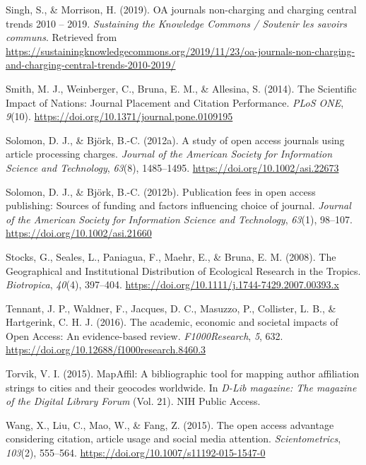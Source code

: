 \documentclass[
  english,
  man]{apa6}
\begin{document}
\leavevmode\hypertarget{ref-singh_oa_2019}{}%
Singh, S., \& Morrison, H. (2019). OA journals non-charging and charging central trends 2010 -- 2019. \emph{Sustaining the Knowledge Commons / Soutenir les savoirs communs}. Retrieved from \url{https://sustainingknowledgecommons.org/2019/11/23/oa-journals-non-charging-and-charging-central-trends-2010-2019/}

\leavevmode\hypertarget{ref-smith_scientific_2014}{}%
Smith, M. J., Weinberger, C., Bruna, E. M., \& Allesina, S. (2014). The Scientific Impact of Nations: Journal Placement and Citation Performance. \emph{PLoS ONE}, \emph{9}(10). \url{https://doi.org/10.1371/journal.pone.0109195}

\leavevmode\hypertarget{ref-solomon_study_2012}{}%
Solomon, D. J., \& Björk, B.-C. (2012a). A study of open access journals using article processing charges. \emph{Journal of the American Society for Information Science and Technology}, \emph{63}(8), 1485--1495. \url{https://doi.org/10.1002/asi.22673}

\leavevmode\hypertarget{ref-solomon_publication_2012}{}%
Solomon, D. J., \& Björk, B.-C. (2012b). Publication fees in open access publishing: Sources of funding and factors influencing choice of journal. \emph{Journal of the American Society for Information Science and Technology}, \emph{63}(1), 98--107. \url{https://doi.org/10.1002/asi.21660}

\leavevmode\hypertarget{ref-stocks_geographical_2008}{}%
Stocks, G., Seales, L., Paniagua, F., Maehr, E., \& Bruna, E. M. (2008). The Geographical and Institutional Distribution of Ecological Research in the Tropics. \emph{Biotropica}, \emph{40}(4), 397--404. \url{https://doi.org/10.1111/j.1744-7429.2007.00393.x}

\leavevmode\hypertarget{ref-tennant_academic_2016}{}%
Tennant, J. P., Waldner, F., Jacques, D. C., Masuzzo, P., Collister, L. B., \& Hartgerink, C. H. J. (2016). The academic, economic and societal impacts of Open Access: An evidence-based review. \emph{F1000Research}, \emph{5}, 632. \url{https://doi.org/10.12688/f1000research.8460.3}

\leavevmode\hypertarget{ref-torvik_mapaffil_2015}{}%
Torvik, V. I. (2015). MapAffil: A bibliographic tool for mapping author affiliation strings to cities and their geocodes worldwide. In \emph{D-Lib magazine: The magazine of the Digital Library Forum} (Vol. 21). NIH Public Access.

\leavevmode\hypertarget{ref-wang_open_2015}{}%
Wang, X., Liu, C., Mao, W., \& Fang, Z. (2015). The open access advantage considering citation, article usage and social media attention. \emph{Scientometrics}, \emph{103}(2), 555--564. \url{https://doi.org/10.1007/s11192-015-1547-0}
\end{document}

